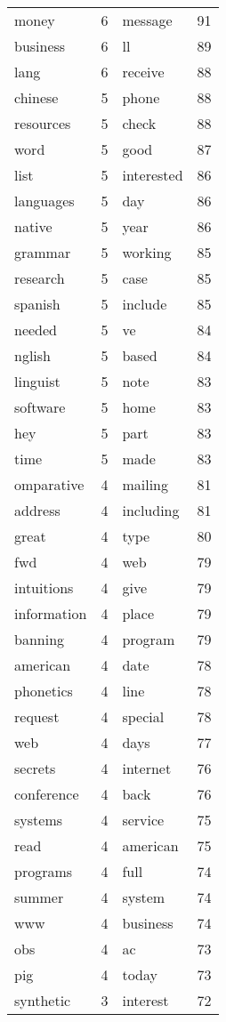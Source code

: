 \documentclass[12pt]{article}
\begin{document}
\begin{tabular}{ | l | l || l | l | }
money & 6 & message & 91\\ 
business & 6 & ll & 89\\ 
lang & 6 & receive & 88\\ 
chinese & 5 & phone & 88\\ 
resources & 5 & check & 88\\ 
word & 5 & good & 87\\ 
list & 5 & interested & 86\\ 
languages & 5 & day & 86\\ 
native & 5 & year & 86\\ 
grammar & 5 & working & 85\\ 
research & 5 & case & 85\\ 
spanish & 5 & include & 85\\ 
needed & 5 & ve & 84\\ 
nglish & 5 & based & 84\\ 
linguist & 5 & note & 83\\ 
software & 5 & home & 83\\ 
hey & 5 & part & 83\\ 
time & 5 & made & 83\\ 
omparative & 4 & mailing & 81\\ 
address & 4 & including & 81\\ 
great & 4 & type & 80\\ 
fwd & 4 & web & 79\\ 
intuitions & 4 & give & 79\\ 
information & 4 & place & 79\\ 
banning & 4 & program & 79\\ 
american & 4 & date & 78\\ 
phonetics & 4 & line & 78\\ 
request & 4 & special & 78\\ 
web & 4 & days & 77\\ 
secrets & 4 & internet & 76\\ 
conference & 4 & back & 76\\ 
systems & 4 & service & 75\\ 
read & 4 & american & 75\\ 
programs & 4 & full & 74\\ 
summer & 4 & system & 74\\ 
www & 4 & business & 74\\ 
obs & 4 & ac & 73\\ 
pig & 4 & today & 73\\ 
synthetic & 3 & interest & 72\\ 

\end{tabular}
\end{document}
